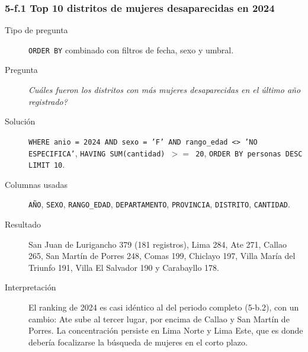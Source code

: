 \subsubsection*{5-f.1 \textbar{} Top 10 distritos de mujeres desaparecidas en 2024}
\begin{description}
\item[Tipo de pregunta] \texttt{ORDER BY} combinado con filtros de fecha, sexo y umbral.
\item[Pregunta] \emph{Cu\'ales fueron los distritos con m\'as mujeres desaparecidas en el
      \'ultimo a\~no registrado?}
\item[Soluci\'on] \texttt{WHERE anio = 2024 AND sexo = 'F' AND rango\_edad <> 'NO ESPECIFICA'},
      \texttt{HAVING SUM(cantidad) $>=$ 20}, \texttt{ORDER BY personas DESC LIMIT 10}.
\item[Columnas usadas] \texttt{A\~NO}, \texttt{SEXO}, \texttt{RANGO\_EDAD},
      \texttt{DEPARTAMENTO}, \texttt{PROVINCIA}, \texttt{DISTRITO}, \texttt{CANTIDAD}.
\item[Resultado] San Juan de Lurigancho 379 (181 registros), Lima 284, Ate 271, Callao 265, San
      Mart\'in de Porres 248, Comas 199, Chiclayo 197, Villa Mar\'ia del Triunfo 191, Villa El
      Salvador 190 y Carabayllo 178.
\item[Interpretaci\'on] El ranking de 2024 es casi id\'entico al del periodo completo (5-b.2),
      con un cambio: Ate sube al tercer lugar, por encima de Callao y San Mart\'in de Porres. La
      concentraci\'on persiste en Lima Norte y Lima Este, que es donde deber\'ia focalizarse la
      b\'usqueda de mujeres en el corto plazo.
\end{description}

